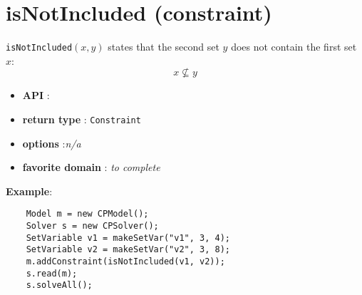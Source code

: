 \label{isnotincluded}
\hypertarget{isnotincluded}{}

\section{isNotIncluded (constraint)}\label{isnotincluded:isnotincludedconstraint}\hypertarget{isnotincluded:isnotincludedconstraint}{}
\begin{notedef}
  \texttt{isNotIncluded}$(x,y)$ states that the second set $y$ does not contain the first set $x$:
 $$x\not\subseteq y$$
\end{notedef}

\begin{itemize}
	\item \textbf{API} : 
	\item \textbf{return type} : \texttt{Constraint}
	\item \textbf{options} :\emph{n/a}
	\item \textbf{favorite domain} : \emph{to complete}
\end{itemize}

\textbf{Example}:
\begin{lstlisting}
	Model m = new CPModel();
	Solver s = new CPSolver();
	SetVariable v1 = makeSetVar("v1", 3, 4);
	SetVariable v2 = makeSetVar("v2", 3, 8);
	m.addConstraint(isNotIncluded(v1, v2));
	s.read(m);
	s.solveAll();
\end{lstlisting} 

